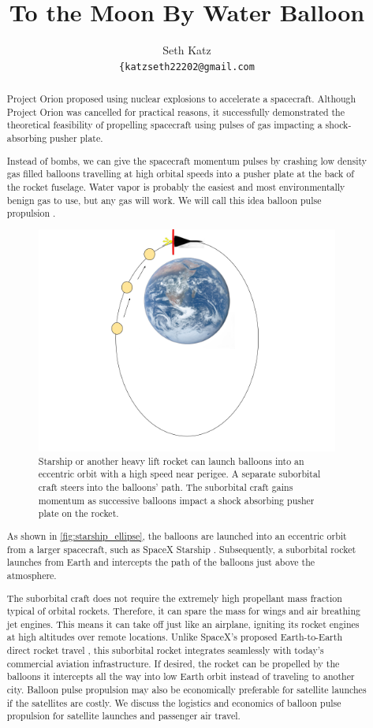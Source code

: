 \documentclass{article}
\title{To the Moon By Water Balloon}
\author{
  Seth Katz \\
  \texttt{\{katzseth22202@gmail.com} \\
}
\begin{document}
\maketitle


\begin{abstract}
    Project Orion \cite{projorion} proposed using nuclear explosions to accelerate a spacecraft.  Although Project Orion was cancelled for practical reasons,  it successfully demonstrated the theoretical feasibility of propelling spacecraft using pulses of gas impacting a shock-absorbing pusher plate.

    Instead of bombs, we can give the spacecraft momentum pulses by crashing low density gas filled balloons travelling at high orbital speeds into a pusher plate at the back of the rocket fuselage.   Water vapor is probably the easiest and most environmentally benign gas to use, but any gas will work.   We will call this idea balloon pulse propulsion \cite{aim2024}.
 \begin{figure}[h]
    \centering
    \includegraphics[width=0.5\linewidth]{images/Starship_Impact_ellipse.png}
    \caption{Starship or another heavy lift rocket  can launch balloons into an eccentric orbit with a high speed near perigee.   A separate suborbital craft steers into the balloons' path.   The suborbital craft gains momentum as successive balloons impact a shock absorbing pusher plate on the rocket.}
    \label{fig:starship_ellipse}
\end{figure}

As shown in \autoref{fig:starship_ellipse}, the balloons are launched into an eccentric orbit from a larger spacecraft, such as SpaceX Starship \cite{starship}.   Subsequently, a suborbital rocket launches from Earth and intercepts the path of the balloons just above the atmosphere.    

The suborbital craft does not require the extremely high propellant mass fraction typical of orbital rockets.   Therefore, it
 can spare the mass for wings and air breathing jet engines.   This means it can take off just like an airplane, igniting its rocket engines at high altitudes over remote locations. Unlike SpaceX’s proposed Earth-to-Earth direct rocket travel \cite{spacex_earth_earth}, this suborbital rocket integrates seamlessly with today’s commercial aviation infrastructure. If desired, the rocket can be propelled by the balloons it intercepts all the way into low Earth orbit instead of traveling to another city.  Balloon pulse propulsion may also be economically preferable for satellite launches if the satellites are costly.   We discuss the logistics and economics of balloon pulse propulsion for satellite launches and passenger air travel.


\end{abstract}
\end{document}

